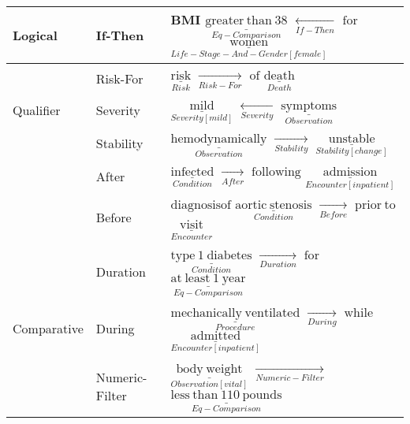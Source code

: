 \begin{tabular}{m{3.8cm} m{2.2cm} m{10cm}}
    \hline
    
    Logical &
        If-Then       & BMI \quad $\underset{Eq-Comparison}{\underline{\mathrm{greater\ than\ 38}}}$ \quad $\xleftarrow[If-Then]{}$ \quad $\mathrm{for}$ \quad $\underset{Life-Stage-And-Gender[female]}{\underline{\mathrm{women}}}$ \\[2ex]
         
    \hline
    
         & Risk-For & $\underset{Risk}{\underline{\mathrm{risk}}}$ \quad $\xrightarrow[Risk-For]{}$ \quad $\mathrm{of}$ \quad $\underset{Death}{\underline{\mathrm{death}}}$ \\
        Qualifier & Severity & $\underset{Severity[mild]}{\underline{\mathrm{mild}}}$ \quad $\xleftarrow[Severity]{}$ \quad $\underset{Observation}{\underline{\mathrm{symptoms}}}$ \\
         & Stability & $\underset{Observation}{\underline{\mathrm{hemodynamically}}}$ \quad $\xrightarrow[Stability]{}$ \quad $\underset{Stability[change]}{\underline{\mathrm{unstable}}}$ \\[2ex]
    
    \hline
    
     &
        After & $\underset{Condition}{\underline{\mathrm{infected}}}$ \quad $\xrightarrow[After]{}$ \quad $\mathrm{following}$ \quad $\underset{Encounter[inpatient]}{\underline{\mathrm{admission}}}$ \\
        
        & Before & $\mathrm{diagnosis of}$ $\underset{Condition}{\underline{\mathrm{aortic\ stenosis}}}$ \quad $\xrightarrow[Before]{}$ \quad $\mathrm{prior\ to}$ \quad $\underset{Encounter}{\underline{\mathrm{visit}}}$ \\
        
        & Duration & $\underset{Condition}{\underline{\mathrm{type\ 1\ diabetes}}}$ \quad $\xrightarrow[Duration]{}$ \quad $\mathrm{for}$ \quad $\underset{Eq-Comparison}{\underline{\mathrm{at\ least\ 1\ year}}}$ \\ 
        Comparative & During & $\underset{Procedure}{\underline{\mathrm{mechanically \ ventilated}}}$ \quad $\xrightarrow[During]{}$ \quad $\mathrm{while}$ \quad $\underset{Encounter[inpatient]}{\underline{\mathrm{admitted}}}$ \\
        
         & Numeric-Filter & $\underset{Observation[vital]}{\underline{\mathrm{body\ weight}}}$ \quad $\xrightarrow[Numeric-Filter]{}$ \quad $\underset{Eq-Comparison}{\underline{\mathrm{less\ than\ 110\ pounds}}}$ \\    
        

\end{tabular}
